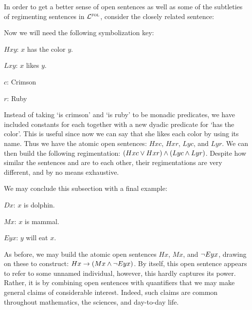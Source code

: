 In order to get a better sense of open sentences as well as some of the subtleties of regimenting sentences in $\mathcal{L}^{\textsc{fol}}$, consider the closely related sentence:

\begin{earg} \label{colors}
\end{earg}

Now we will need the following symbolization key:

\begin{ekey}[leftmargin=.7in]
  \item[$Hxy$:] $x$ has the color $y$.
  \item[$Lxy$:] $x$ likes $y$.
  \item[$c$:] Crimson
  \item[$r$:] Ruby
\end{ekey}

Instead of taking `is crimson' and `is ruby' to be monadic predicates, we have included constants for each together with a new dyadic predicate for `has the color'.
This is useful since now we can say that she likes each color by using its name.
Thus we have the atomic open sentences: $Hxc$, $Hxr$, $Lyc$, and $Lyr$.
We can then build the following regimentation: $(Hxc \vee Hxr) \wedge (Lyc \wedge Lyr)$.
Despite how similar the sentences  and  are to each other, their regimentations are very different, and by no means exhaustive.

We may conclude this subsection with a final example:

\begin{earg} \label{dolphin}
\end{earg}


\begin{ekey}[leftmargin=.7in]
\item[$Dx$:] $x$ is dolphin.
\item[$Mx$:] $x$ is mammal.
\item[$Eyx$:] $y$ will eat $x$.
\end{ekey}

As before, we may build the atomic open sentences $Hx$, $Mx$, and $\neg Eyx$, drawing on these to construct: $Hx \rightarrow (Mx \wedge \neg Eyx)$.
By itself, this open sentence appears to refer to some unnamed individual, however, this hardly captures its power.
Rather, it is by combining open sentences with quantifiers that we may make general claims of considerable interest.
Indeed, such claims are common throughout mathematics, the sciences, and day-to-day life.



